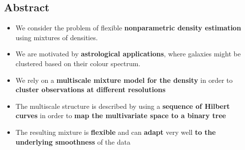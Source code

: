 \documentclass[a0,portrait]{a0poster}
\newcommand{\comirep}{\textsc{c}o\textsc{m}i\textsc{r}e}
\begin{document}
\begin{multicols}{2} %


\color{DarkRed}

\section*{Abstract}

\begin{itemize}
\item[] We consider the problem of flexible \textbf{nonparametric density estimation} using mixtures of densities.
\item[] We are motivated by \textbf{astrological applications}, where galaxies might be clustered based on their colour spectrum.
\item[] We rely on a \textbf{multiscale mixture model for the density} in order to \textbf{cluster observations at different resolutions}
\item[] The multiscale structure is described by using a \textbf{sequence of Hilbert curves} in order to \textbf{map the multivariate space to a binary tree}
\item[] The resulting mixture is \textbf{flexible} and can \textbf{adapt} very well \textbf{to the underlying smoothness} of the data
\end{itemize}




\end{multicols}
\end{document}
